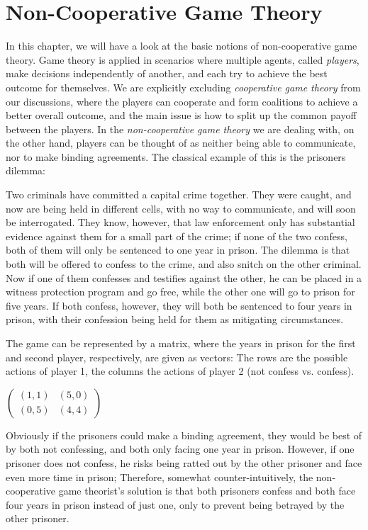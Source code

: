 \documentclass[a4paper]{scrreprt}
\begin{document}
    \chapter{Non-Cooperative Game Theory}
    In this chapter, we will have a look at the basic notions of non-cooperative game theory.
    Game theory is applied in scenarios where multiple agents, called \emph{players}, make decisions independently of another, and each try to achieve the best outcome for themselves.
    We are explicitly excluding \emph{cooperative game theory} from our discussions, where the players can cooperate and form coalitions to achieve a better overall outcome, and the main issue is how to split up the common payoff between the players.
    In the \emph{non-cooperative game theory} we are dealing with, on the other hand, players can be thought of as neither being able to communicate, nor to make binding agreements. 
    The classical example of this is the prisoners dilemma:
    \begin{ex}
        Two criminals have committed a capital crime together. They were caught, and now are being held in different cells, with no way to communicate, and will soon be interrogated.
        They know, however, that law enforcement only has substantial evidence against them for a small part of the crime; if none of the two confess, both of them will only be sentenced to one year in prison.
        The dilemma is that both will be offered to confess to the crime, and also snitch on the other criminal. Now if one of them confesses and testifies against the other, he can be placed in a witness protection program and go free, while the other one will go to prison for five years. If both confess, however, they will both be sentenced to four years in prison, with their confession being held for them as mitigating circumstances.
        
        The game can be represented by a matrix, where the years in prison for the first and second player, respectively, are given as vectors:
        The rows are the possible actions of player 1, the columns the actions of player 2 (not confess vs. confess).
        
        \begin{table*}[h]
            \centering
            $\begin{pmatrix}
                (1, 1) & (5, 0) \\
                (0, 5) & (4, 4)
            \end{pmatrix}$
        \end{table*}
    
        Obviously if the prisoners could make a binding agreement, they would be best of by both not confessing, and both only facing one year in prison.
        However, if one prisoner does not confess, he risks being ratted out by the other prisoner and face even more time in prison; 
        Therefore, somewhat counter-intuitively, the non-cooperative game theorist's solution is that both prisoners confess and both face four years in prison instead of just one, only to prevent being betrayed by the other prisoner.
        \label{ex:prisonersDilemma}
        \label{ex:gameTheoryIntroductoryExample}
    \end{ex}
\end{document}
